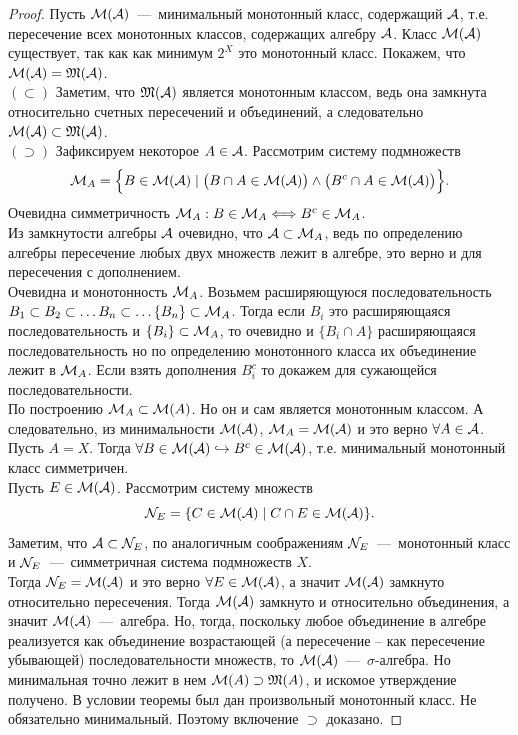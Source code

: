 \begin{proof}
    Пусть $\mathcal{M}(\mathcal{A})$~---~минимальный монотонный класс, содержащий $\mathcal{A}$, т.е. пересечение всех монотонных классов, содержащих алгебру $\mathcal{A}$. Класс $\mathcal{M}(\mathcal{A})$ существует, так как как минимум $2^X$ это монотонный класс. Покажем, что $\mathcal{M}(\mathcal{A}) = \mathfrak{M}(\mathcal{A})$. \\
    $(\subset)$ Заметим, что $\mathfrak{M}(\mathcal{A})$ является монотонным классом, ведь она замкнута относительно счетных пересечений и объединений, а следовательно $\mathcal{M}(\mathcal{A}) \subset \mathfrak{M}(\mathcal{A})$. \\
    $(\supset)$ Зафиксируем некоторое $A \in \mathcal{A}$. Рассмотрим систему подмножеств \[\mathcal{M}_A = \Big\{B \in \mathcal{M}(\mathcal{A}) \mid \big(B \cap A \in \mathcal{M}(\mathcal{A})\big) \wedge \big(B^c \cap A \in \mathcal{M}(\mathcal{A}) \big) \Big\}.\]
    Очевидна симметричность $\mathcal{M}_A: B \in \mathcal{M}_A \Longleftrightarrow B^c \in \mathcal{M}_A$.\\
    Из замкнутости алгебры $\mathcal{A}$ очевидно, что $\mathcal{A} \subset \mathcal{M}_A$, ведь по определению алгебры пересечение любых двух множеств лежит в алгебре, это верно и для пересечения с дополнением.\\
    Очевидна и монотонность $\mathcal{M}_A$. Возьмем расширяющуюся последовательность $B_1 \subset B_2 \subset \ldots B_n \subset \ldots \{ B_n \} \subset \mathcal{M}_A$. Тогда если $B_i$ это расширяющаяся последовательность и $\{B_i\} \subset \mathcal{M}_A$, то очевидно и $\{B_i \cap A\}$ расширяющаяся последовательность но по определению монотонного класса их объединение лежит в $\mathcal{M}_A$. Если взять дополнения $B_i^c$ то докажем для сужающейся последовательности.\\
    По построению $\mathcal{M}_A \subset\mathcal{M}(A)$. Но он и сам является монотонным классом. А следовательно, из минимальности $\mathcal{M}(\mathcal{A})$, $\mathcal{M}_A = \mathcal{M}(\mathcal{A})$ и это верно $\forall A \in \mathcal{A}$.\\
    Пусть $A = X$. Тогда $\forall B \in \mathcal{M}(\mathcal{A}) \hookrightarrow B^c \in \mathcal{M}(\mathcal{A})$, т.е. минимальный монотонный класс симметричен. \\
    Пусть $E \in \mathcal{M}(\mathcal{A})$. Рассмотрим систему множеств \[\mathcal{N}_E = \{C \in \mathcal{M}(\mathcal{A}) \mid C \cap E \in \mathcal{M}(\mathcal{A})\}.\]
    Заметим, что $\mathcal{A} \subset \mathcal{N}_E$, по аналогичным соображениям $\mathcal{N}_E$~---~монотонный класс и $\mathcal{N}_E$~---~симметричная система подмножеств $X$.\\
    Тогда $\mathcal{N}_E = \mathcal{M}(\mathcal{A})$ и это верно $\forall E \in \mathcal{M}(\mathcal{A})$, а значит $\mathcal{M}(\mathcal{A})$ замкнуто относительно пересечения. Тогда $\mathcal{M}(\mathcal{A})$ замкнуто и относительно объединения, а значит $\mathcal{M}(\mathcal{A})$~---~алгебра. Но, тогда, поскольку любое объединение в алгебре реализуется как объединение возрастающей (а пересечение -- как пересечение убывающей) последовательности множеств, то $\mathcal{M}(\mathcal{A})$~---~$\sigma$-алгебра. Но минимальная точно лежит в нем $\mathcal{M}(A) \supset \mathfrak{M}(A)$, и искомое утверждение получено. В условии теоремы был дан произвольный монотонный класс. Не обязательно минимальный. Поэтому включение $\supset$ доказано.
\end{proof}
